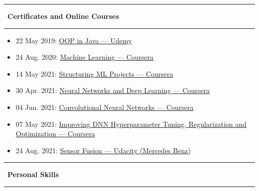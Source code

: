 \documentclass[10pt,a4paper]{article}
\newcommand{\sectionline}[1]{%
  \vspace{0.5em}
  \begin{center}
    \textcolor{title_color}{\rule[0.5ex]{0.25\linewidth}{0.5pt}}
    ~{\LARGE \bfseries \textcolor{title_color}{\cambria #1}}~
    \textcolor{title_color}{\rule[0.5ex]{0.25\linewidth}{0.5pt}}
  \end{center}
  \vspace{0.05em}
}
\begin{document}
\sectionline{Certificates and Online Courses}
\begin{itemize}[leftmargin=*]
  \item 22 May 2019: \href{https://www.udemy.com/certificate/UC-XN2ILPOB/}{OOP in Java — Udemy}
  \item 24 Aug. 2020: \href{https://coursera.org/share/e32b80d8e0b32b48e4ad6fe40cea746e}{Machine Learning — Coursera}
  \item 14 May 2021: \href{https://coursera.org/share/15d74342746d2872a09dcc5a75ff460c}{Structuring ML Projects — Coursera}
  \item 30 Apr. 2021: \href{https://coursera.org/share/0ca157f56b99f56122ab247589555837}{Neural Networks and Deep Learning — Coursera}
  \item 04 Jun. 2021: \href{https://coursera.org/share/e0bd7b6ea301e1108dfe609c783f2706}{Convolutional Neural Networks — Coursera}
  \item 07 May 2021: \href{https://coursera.org/share/ef6671ff524b9d2e5c1e0e282d457f56}{Improving DNN Hyperparameter Tuning, Regularization and Optimization — Coursera}
  \item 24 Aug. 2021: \href{http://www.udacity.com/certificate/e/95ce8498-c21f-11eb-aa1a-5f098308d726}{Sensor Fusion — Udacity (Mercedes Benz)}
\end{itemize}          



\sectionline{Personal Skills}
\end{document}
